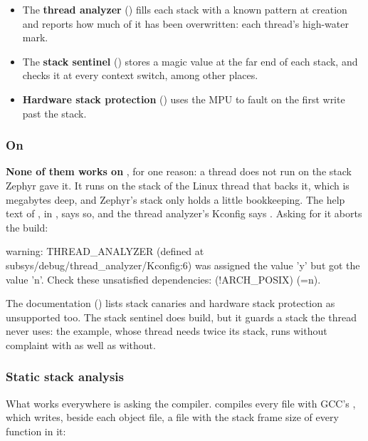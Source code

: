 \begin{itemize}
  \item The \textbf{thread analyzer} () fills each stack with a known pattern
    at creation and reports how much of it has been overwritten: each thread’s high-water mark.
  \item The \textbf{stack sentinel} () stores a magic value at the far end of
    each stack, and checks it at every context switch, among other places.
  \item \textbf{Hardware stack protection} () uses the MPU to fault on the
    first write past the stack.
\end{itemize}

\subsubsection{On }
\textbf{None of them works on }, for one reason: a  thread does
not run on the stack Zephyr gave it. It runs on the stack of the Linux thread that backs it, which
is megabytes deep, and Zephyr’s stack only holds a little bookkeeping. The help text of
, in , says so,
and the thread analyzer’s Kconfig says . Asking for it aborts the
build:

\begin{console}
warning: THREAD_ANALYZER (defined at subsys/debug/thread_analyzer/Kconfig:6) was assigned the value
'y' but got the value 'n'. Check these unsatisfied dependencies: (!ARCH_POSIX) (=n).
\end{console}

\noindent The documentation () lists stack canaries
and hardware stack protection as unsupported too. The stack sentinel does build, but it guards a
stack the thread never uses: the  example, whose thread needs twice its stack,
runs without complaint with  as well as without.

\subsubsection{Static stack analysis}
What works everywhere is asking the compiler. \textbf{} compiles every
file with GCC’s , which writes, beside each object file, a  file with
the stack frame size of every function in it:

